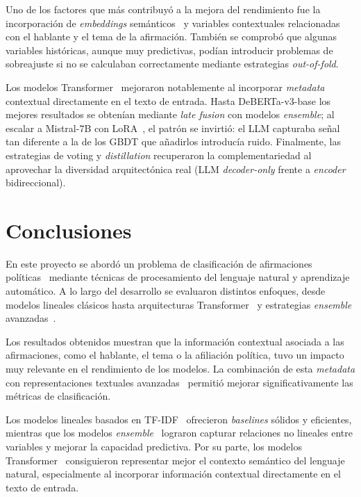 \documentclass[12pt,a4paper]{article}
\begin{document}
Uno de los factores que más contribuyó a la mejora del rendimiento fue la incorporación de \emph{embeddings} semánticos~\cite{sbert} y variables contextuales relacionadas con el hablante y el tema de la afirmación. También se comprobó que algunas variables históricas, aunque muy predictivas, podían introducir problemas de sobreajuste si no se calculaban correctamente mediante estrategias \emph{out-of-fold}.

Los modelos Transformer~\cite{hf_transformers,deberta} mejoraron notablemente al incorporar \emph{metadata} contextual directamente en el texto de entrada. Hasta DeBERTa-v3-base los mejores resultados se obtenían mediante \emph{late fusion} con modelos \emph{ensemble}; al escalar a Mistral-7B con LoRA~\cite{peft,mistral}, el patrón se invirtió: el LLM capturaba señal tan diferente a la de los GBDT que añadirlos introducía ruido. Finalmente, las estrategias de voting y \emph{distillation} recuperaron la complementariedad al aprovechar la diversidad arquitectónica real (LLM \emph{decoder-only} frente a \emph{encoder} bidireccional).


\section{Conclusiones}

En este proyecto se abordó un problema de clasificación de afirmaciones políticas~\cite{liar} mediante técnicas de procesamiento del lenguaje natural y aprendizaje automático. A lo largo del desarrollo se evaluaron distintos enfoques, desde modelos lineales clásicos hasta arquitecturas Transformer~\cite{hf_transformers,deberta} y estrategias \emph{ensemble} avanzadas~\cite{lgbm,catboost,xgboost}.

Los resultados obtenidos muestran que la información contextual asociada a las afirmaciones, como el hablante, el tema o la afiliación política, tuvo un impacto muy relevante en el rendimiento de los modelos. La combinación de esta \emph{metadata} con representaciones textuales avanzadas~\cite{sbert} permitió mejorar significativamente las métricas de clasificación.

Los modelos lineales basados en TF-IDF~\cite{sklearn} ofrecieron \emph{baselines} sólidos y eficientes, mientras que los modelos \emph{ensemble}~\cite{lgbm,catboost,xgboost} lograron capturar relaciones no lineales entre variables y mejorar la capacidad predictiva. Por su parte, los modelos Transformer~\cite{hf_transformers,deberta} consiguieron representar mejor el contexto semántico del lenguaje natural, especialmente al incorporar información contextual directamente en el texto de entrada.
\end{document}
